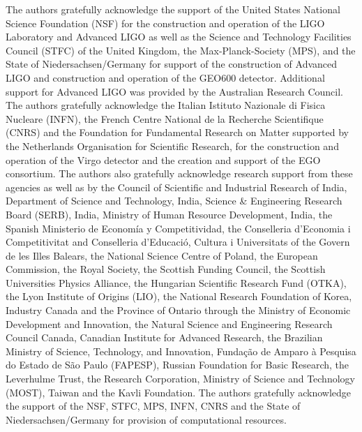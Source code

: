 \documentclass[twocolumn]{aastex6}
\begin{document}
The authors gratefully acknowledge the support of the United States
National Science Foundation (NSF) for the construction and operation of the
LIGO Laboratory and Advanced LIGO as well as the Science and Technology Facilities Council (STFC) of the
United Kingdom, the Max-Planck-Society (MPS), and the State of
Niedersachsen/Germany for support of the construction of Advanced LIGO 
and construction and operation of the GEO600 detector. 
Additional support for Advanced LIGO was provided by the Australian Research Council.
The authors gratefully acknowledge the Italian Istituto Nazionale di Fisica Nucleare (INFN),  
the French Centre National de la Recherche Scientifique (CNRS) and
the Foundation for Fundamental Research on Matter supported by the Netherlands Organisation for Scientific Research, 
for the construction and operation of the Virgo detector
and the creation and support  of the EGO consortium. 
The authors also gratefully acknowledge research support from these agencies as well as by 
the Council of Scientific and Industrial Research of India, 
Department of Science and Technology, India,
Science \& Engineering Research Board (SERB), India,
Ministry of Human Resource Development, India,
the Spanish Ministerio de Econom\'ia y Competitividad,
the Conselleria d'Economia i Competitivitat and Conselleria d'Educaci\'o, Cultura i Universitats of the Govern de les Illes Balears,
the National Science Centre of Poland,
the European Commission,
the Royal Society, 
the Scottish Funding Council, 
the Scottish Universities Physics Alliance, 
the Hungarian Scientific Research Fund (OTKA),
the Lyon Institute of Origins (LIO),
the National Research Foundation of Korea,
Industry Canada and the Province of Ontario through the Ministry of Economic Development and Innovation, 
the Natural Science and Engineering Research Council Canada,
Canadian Institute for Advanced Research,
the Brazilian Ministry of Science, Technology, and Innovation,
Funda\c{c}\~ao de Amparo \`a Pesquisa do Estado de S\~ao Paulo (FAPESP),
Russian Foundation for Basic Research,
the Leverhulme Trust, 
the Research Corporation, 
Ministry of Science and Technology (MOST), Taiwan
and
the Kavli Foundation.
The authors gratefully acknowledge the support of the NSF, STFC, MPS, INFN, CNRS and the
State of Niedersachsen/Germany for provision of computational resources.




\end{document}
